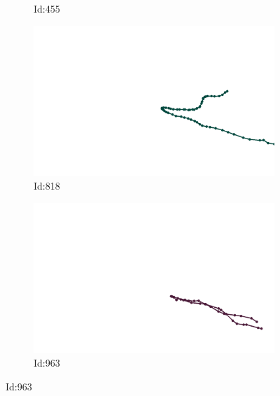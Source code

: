 \documentclass[12pt,twoside]{report}
\begin{document}
\begin{figure}
\begin{subfigure}[b]{0.20\textwidth}
\caption{Id:455}
\end{subfigure}
\begin{subfigure}[b]{0.20\textwidth}
\centering
\includegraphics[width=\textwidth]{../../trajectories/818.png}
\caption{Id:818}
\end{subfigure}
\begin{subfigure}[b]{0.20\textwidth}
\centering
\includegraphics[width=\textwidth]{../../trajectories/963.png}
\caption{Id:963}
\end{subfigure}
\end{figure}
\end{document}
